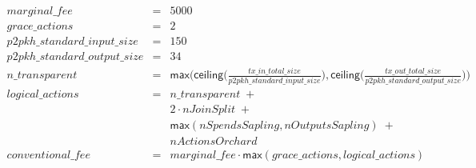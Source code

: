 \documentclass[]{article}
\begin{document}
\[
\begin{array}{rcl}
	marginal\_fee &=& 5000 \\
	grace\_actions &=& 2 \\
	p2pkh\_standard\_input\_size &=& 150 \\
	p2pkh\_standard\_output\_size &=& 34 \\
	n\_transparent &=& \mathsf{max}\big(\mathsf{ceiling}\big(\frac{tx\_in\_total\_size}{p2pkh\_standard\_input\_size}\big),
	\mathsf{ceiling}\big(\frac{tx\_out\_total\_size}{p2pkh\_standard\_output\_size}\big)\big) \\
	logical\_actions  &=& n\_transparent \;+ \\
	& & 2 \cdot nJoinSplit \;+ \\
	& & \mathsf{max}(nSpendsSapling, nOutputsSapling) \;+ \\
	& & nActionsOrchard \\
	conventional\_fee &=& marginal\_fee \cdot \mathsf{max}(grace\_actions, logical\_actions)
\end{array}
\]
\end{document}

